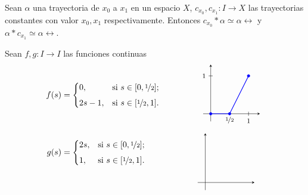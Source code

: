     \begin{lema}
    \label{lema:neutro_Pi_1}
        Sean $\alpha$ una trayectoria de $x_0$ a $x_1$ en un espacio $X$, $c_{x_0},c_{x_1}:I\to X$ las trayectorias constantes con valor $x_0,x_1$ respectivamente. Entonces $c_{x_0}*\alpha\simeq \alpha\rel$ y $\alpha*c_{x_1}\simeq \alpha\rel$.
    \end{lema}
    \begin{dem}
        Sean $f,g:I\to I$ las funciones continuas
    \begin{align*}
    f(s) &=
    \begin{cases} 
        0, & \text{si } s\in [0,\nicefrac{1}{2}]; \\[1ex]
        2s-1, & \text{si } s \in [\nicefrac{1}{2},1].
    \end{cases}
    \hspace{1.5cm}
    \vcenter{\hbox{
    \begin{tikzpicture}[scale=1.6]
        \draw[->, >=stealth] (-0.2, 0) -- (1.3, 0);
        \draw[->, >=stealth] (0, -0.2) -- (0, 1.3);
        \node[below, font=\footnotesize] at (0.5, 0) {$\nicefrac{1}{2}$};
        \draw (1, 1.5pt) -- (1, -1.5pt) node[below, font=\footnotesize] {$1$};
        \draw (1.5pt, 1) -- (-1.5pt, 1) node[left, font=\footnotesize] {$1$};
        \draw[thick, blue] (0,0) -- (0.5,0) -- (1,1);
        \filldraw[blue] (0,0) circle (1pt);
        \filldraw[blue] (0.5,0) circle (1pt);
        \filldraw[blue] (1,1) circle (1pt);
    \end{tikzpicture}
    }}
    \\[1ex] %
    g(s) &=
    \begin{cases} 
        2s, & \text{si } s\in [0,\nicefrac{1}{2}]; \\[1ex]
        1, & \text{si } s \in [\nicefrac{1}{2},1].
    \end{cases}
    \hspace{2.023cm} 
    \raisebox{-1.5cm}{\hbox{ 
    \begin{tikzpicture}[scale=1.6]
        \draw[->, >=stealth] (-0.2, 0) -- (1.3, 0);
        \draw[->, >=stealth] (0, -0.2) -- (0, 1.3);

\end{tikzpicture}}}
\end{align*}
\end{dem}
